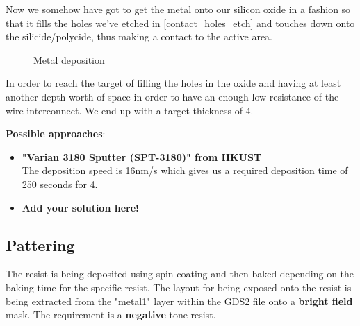 Now we somehow have got to get the metal onto our silicon oxide in a fashion so that it fills the holes we've etched in \autoref{contact_holes_etch} and touches down onto the silicide/polycide, thus making a contact to the active area.

\begin{figure}[H]
	\centering
	\begin{tikzpicture}[node distance = 3cm, auto, thick,scale=\CrossSectionOnly, every node/.style={transform shape}]
		
	\end{tikzpicture}
	\drawStepArrow{}
	\begin{tikzpicture}[node distance = 3cm, auto, thick,scale=\CrossSectionOnly, every node/.style={transform shape}]
		
	\end{tikzpicture}
	\caption{Metal deposition}
\end{figure}

In order to reach the target of filling the holes in the oxide and having at least another depth worth of space in order to have an enough low resistance of the wire interconnect.
We end up with a target thickness of 4\um.

\textbf{Possible approaches}:
\begin{itemize}
	\item \textbf{"Varian 3180 Sputter (SPT-3180)" from HKUST} \\
	The deposition speed is 16nm/s which gives us a required deposition time of 250 seconds for 4\um.
	\item \textbf{Add your solution here!}
\end{itemize}

\subsection{Pattering}
The resist is being deposited using spin coating and then baked depending on the baking time for the specific resist.
The layout for being exposed onto the resist is being extracted from the "metal1" layer within the GDS2 file onto a \textbf{bright field} mask.
The requirement is a \textbf{negative} tone resist.

